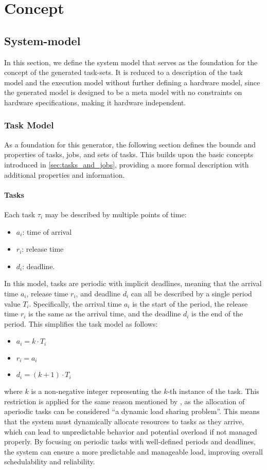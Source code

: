 \chapter{Concept}\label{ch:concept}
\section{System-model}\label{sec:model}
In this section, we define the system model that serves as the foundation for the concept of the generated task-sets.
It is reduced to a description of the task model and the execution model without further defining a hardware model, since the generated model is designed to be a meta model with no constraints on hardware specifications, making it hardware independent.

\subsection{Task Model}\label{sec:task_model}
As a foundation for this generator, the following section defines the bounds and properties of tasks, jobs, and sets of tasks. This builds upon the basic concepts introduced in \cref{sec:tasks_and_jobs}, providing a more formal description with additional properties and information.

\subsubsection{Tasks}\label{sec:task}
Each task $\tau_i$ may be described by multiple points of time:
\begin{itemize}
    \item $a_i$: time of arrival
    \item $r_i$: release time
    \item $d_i$: deadline.
\end{itemize}
In this model, tasks are periodic with implicit deadlines, meaning that the arrival time $a_i$, release time $r_i$, and deadline $d_i$ can all be described by a single period value $T_i$. 
Specifically, the arrival time $a_i$ is the start of the period, the release time $r_i$ is the same as the arrival time, and the deadline $d_i$ is the end of the period. 
This simplifies the task model as follows:
\begin{itemize}
	\item $a_i = k \cdot T_i$
	\item $r_i = a_i$
	\item $d_i = (k + 1) \cdot T_i$
\end{itemize}
where $k$ is a non-negative integer representing the $k$-th instance of the task.
This restriction is applied for the same reason mentioned by \textcite{dar-tzenpengAssignmentSchedulingCommunicating1997}, as the allocation of aperiodic tasks can be considered ``a dynamic load sharing problem''\cite{dar-tzenpengAssignmentSchedulingCommunicating1997}. 
This means that the system must dynamically allocate resources to tasks as they arrive, which can lead to unpredictable behavior and potential overload if not managed properly. 
By focusing on periodic tasks with well-defined periods and deadlines, the system can ensure a more predictable and manageable load, improving overall schedulability and reliability.

